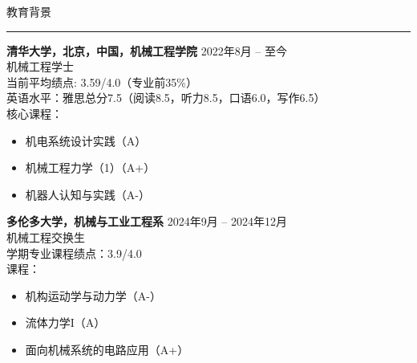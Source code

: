 \documentclass{resume} %
\renewenvironment{rSection}[1]{
\sectionskip
\textcolor{TsinghuaPurple}{\MakeUppercase{#1}}
\sectionlineskip
\hrule
\begin{list}{}{
\setlength{\leftmargin}{0em}
}
\item[]
}{
\end{list}
}
\begin{document}

\begin{rSection}{教育背景}

{\bf 清华大学，北京，中国，机械工程学院 } \hfill {2022年8月 -- 至今}
\\ 
机械工程学士
\\
当前平均绩点\@: 3.59/4.0（专业前35\%）
\\
英语水平：雅思总分7.5（阅读8.5，听力8.5，口语6.0，写作6.5）
\\
核心课程：
\begin{itemize}[itemsep = -0.5em, topsep = -0.5em]
    \item 机电系统设计实践（A）
    \item 机械工程力学（1）（A+）
    \item 机器人认知与实践（A-）
\end{itemize}

\vspace{11pt}

{\bf 多伦多大学，机械与工业工程系 } \hfill {2024年9月 -- 2024年12月}
\\ 
机械工程交换生
\\
学期专业课程绩点：3.9/4.0
\\
课程：
\begin{itemize}[itemsep = -0.5em, topsep = -0.5em]
    \item 机构运动学与动力学（A-）
    \item 流体力学I（A）
    \item 面向机械系统的电路应用（A+）
\end{itemize}

\end{rSection}

\end{document}

